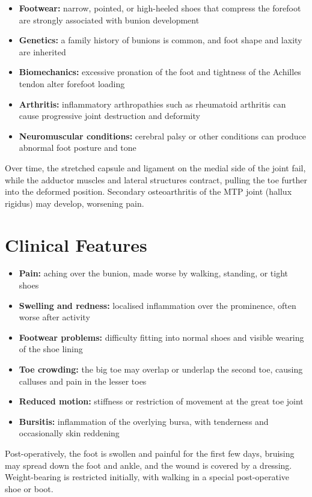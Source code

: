 \begin{itemize}
    \item \textbf{Footwear:} narrow, pointed, or high-heeled shoes that compress the forefoot are strongly associated with bunion development
    \item \textbf{Genetics:} a family history of bunions is common, and foot shape and laxity are inherited
    \item \textbf{Biomechanics:} excessive pronation of the foot and tightness of the Achilles tendon alter forefoot loading
    \item \textbf{Arthritis:} inflammatory arthropathies such as rheumatoid arthritis can cause progressive joint destruction and deformity
    \item \textbf{Neuromuscular conditions:} cerebral palsy or other conditions can produce abnormal foot posture and tone
\end{itemize}

Over time, the stretched capsule and ligament on the medial side of the joint fail, while the adductor muscles and lateral structures contract, pulling the toe further into the deformed position. Secondary osteoarthritis of the MTP joint (hallux rigidus) may develop, worsening pain.

\section*{Clinical Features}
\begin{itemize}
    \item \textbf{Pain:} aching over the bunion, made worse by walking, standing, or tight shoes
    \item \textbf{Swelling and redness:} localised inflammation over the prominence, often worse after activity
    \item \textbf{Footwear problems:} difficulty fitting into normal shoes and visible wearing of the shoe lining
    \item \textbf{Toe crowding:} the big toe may overlap or underlap the second toe, causing calluses and pain in the lesser toes
    \item \textbf{Reduced motion:} stiffness or restriction of movement at the great toe joint
    \item \textbf{Bursitis:} inflammation of the overlying bursa, with tenderness and occasionally skin reddening
\end{itemize}

Post-operatively, the foot is swollen and painful for the first few days, bruising may spread down the foot and ankle, and the wound is covered by a dressing. Weight-bearing is restricted initially, with walking in a special post-operative shoe or boot.


